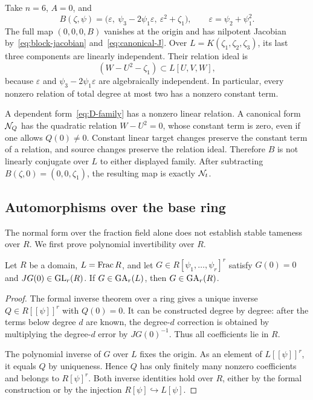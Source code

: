 \begin{example}\label{ex:fiber-constant}
Take $n=6$, $A=0$, and
\[
 B(\zeta,\psi)=\bigl(\varepsilon,\ \psi_3-2\psi_1\varepsilon,\ \varepsilon^2+\zeta_1\bigr),\qquad \varepsilon=\psi_2+\psi_1^2.
\]
The full map $(0,0,0,B)$ vanishes at the origin and has nilpotent Jacobian by~\eqref{eq:block-jacobian} and~\eqref{eq:canonical-J}. Over $L=K(\zeta_1,\zeta_2,\zeta_3)$, its last three components are linearly independent. Their relation ideal is
\[
 (W-U^2-\zeta_1)\subset L[U,V,W],
\]
because $\varepsilon$ and $\psi_3-2\psi_1\varepsilon$ are algebraically independent. In particular, every nonzero relation of total degree at most two has a nonzero constant term.

A dependent form~\eqref{eq:D-family} has a nonzero linear relation. A canonical form $\mathcal N_Q$ has the quadratic relation $W-U^2=0$, whose constant term is zero, even if one allows $Q(0)\neq0$. Constant linear target changes preserve the constant term of a relation, and source changes preserve the relation ideal. Therefore $B$ is not linearly conjugate over $L$ to either displayed family. After subtracting $B(\zeta,0)=(0,0,\zeta_1)$, the resulting map is exactly $\mathcal N_t$.
\end{example}

\subsection{Automorphisms over the base ring}
The normal form over the fraction field alone does not establish stable tameness over $R$. We first prove polynomial invertibility over $R$.

\begin{lemma}\label{lem:inverse-descent}
Let $R$ be a domain, $L=\operatorname{Frac} R$, and let $G\in R[\psi_1,\ldots,\psi_r]^r$ satisfy $G(0)=0$ and $JG(0)\in\operatorname{GL}_r(R)$. If $G\in\operatorname{GA}_r(L)$, then $G\in\operatorname{GA}_r(R)$.
\end{lemma}

\begin{proof}
The formal inverse theorem over a ring gives a unique inverse $Q\in R[[\psi]]^r$ with $Q(0)=0$. It can be constructed degree by degree: after the terms below degree $d$ are known, the degree-$d$ correction is obtained by multiplying the degree-$d$ error by $JG(0)^{-1}$. Thus all coefficients lie in $R$.

The polynomial inverse of $G$ over $L$ fixes the origin. As an element of $L[[\psi]]^r$, it equals $Q$ by uniqueness. Hence $Q$ has only finitely many nonzero coefficients and belongs to $R[\psi]^r$. Both inverse identities hold over $R$, either by the formal construction or by the injection $R[\psi]\hookrightarrow L[\psi]$.
\end{proof}

